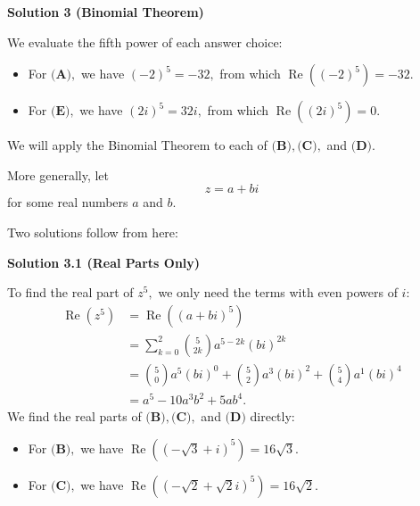 \begin{enumerate}
\textbf{Solution 3 (Binomial Theorem)}

We evaluate the fifth power of each answer choice:

 
            \begin{itemize}
        \item For $\textbf{(A)},$ we have $(-2)^5=-32,$ from which $\operatorname{Re}\left((-2)^5\right)=-32.$
            \end{itemize}
            
            \begin{itemize}
        \item For $\textbf{(E)},$ we have $(2i)^5=32i,$ from which $\operatorname{Re}\left((2i)^5\right)=0.$
            \end{itemize}
            We will apply the Binomial Theorem to each of $\textbf{(B)},\textbf{(C)},$ and $\textbf{(D)}.$

 More generally, let 
 \[z=a+bi\] for some real numbers $a$ and $b.$

 Two solutions follow from here:

 



\textbf{Solution 3.1 (Real Parts Only)}

To find the real part of $z^5,$ we only need the terms with even powers of $i:$
 \begin{align*} \operatorname{Re}\left(z^5\right)&=\operatorname{Re}\left((a+bi)^5\right) \\ &=\sum_{k=0}^{2}\binom{5}{2k}a^{5-2k}(bi)^{2k} \\ &=\binom50 a^{5}(bi)^{0} + \binom52 a^{3}(bi)^{2} + \binom54 a^{1}(bi)^{4} \\ &=a^5 - 10a^3b^2 + 5ab^4. \end{align*}
We find the real parts of $\textbf{(B)},\textbf{(C)},$ and $\textbf{(D)}$ directly:

 
            \begin{itemize}
        \item For $\textbf{(B)},$ we have $\operatorname{Re}\left(\left(-\sqrt3+i\right)^5\right)=16\sqrt3.$
            \end{itemize}
            
            \begin{itemize}
        \item For $\textbf{(C)},$ we have $\operatorname{Re}\left(\left(-\sqrt2+\sqrt2 i\right)^5\right)=16\sqrt2.$
            \end{itemize}
            

\end{enumerate}
